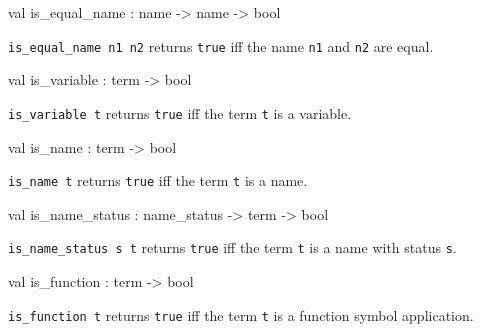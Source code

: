 \label{val:Term.is-underscoreequal-underscorename}\begin{ocamldoccode}
val is_equal_name : name -> name -> bool
\end{ocamldoccode}
\begin{ocamldocdescription}
{\tt{is\_equal\_name n1 n2}} returns {\tt{true}} iff the name {\tt{n1}} and {\tt{n2}} are equal.


\end{ocamldocdescription}




\label{val:Term.is-underscorevariable}\begin{ocamldoccode}
val is_variable : term -> bool
\end{ocamldoccode}
\begin{ocamldocdescription}
{\tt{is\_variable t}} returns {\tt{true}} iff the term {\tt{t}} is a variable.


\end{ocamldocdescription}




\label{val:Term.is-underscorename}\begin{ocamldoccode}
val is_name : term -> bool
\end{ocamldoccode}
\begin{ocamldocdescription}
{\tt{is\_name t}} returns {\tt{true}} iff the term {\tt{t}} is a name.


\end{ocamldocdescription}




\label{val:Term.is-underscorename-underscorestatus}\begin{ocamldoccode}
val is_name_status : name_status -> term -> bool
\end{ocamldoccode}
\begin{ocamldocdescription}
{\tt{is\_name\_status s t}} returns {\tt{true}} iff the term {\tt{t}} is a name with status {\tt{s}}.


\end{ocamldocdescription}




\label{val:Term.is-underscorefunction}\begin{ocamldoccode}
val is_function : term -> bool
\end{ocamldoccode}
\begin{ocamldocdescription}
{\tt{is\_function t}} returns {\tt{true}} iff the term {\tt{t}} is a function symbol application.


\end{ocamldocdescription}




